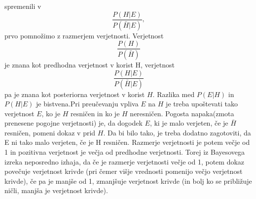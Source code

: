 \documentclass[12pt,a4paper]{amsart}
\theoremstyle{definition} %
\theoremstyle{plain} %
\begin{document}
spremenili v 
\[
    \frac{P(H \lvert E)}{P(\bar{H} \lvert E)},
\] 
prvo pomnožimo z razmerjem verjetnosti. Verjetnost 
\[
    \frac{P(H)}{P(\bar{H})}
\]
je znana kot predhodna verjetnost v korist H, verjetnost 
\[
    \frac{P(H \lvert E)}{P(\bar{H} \lvert E)} 
\]
pa je znana kot posteriorna verjetnost v korist $H$. Razlika med $P(E \lvert H)$ in $P(H \lvert E)$ je bistvena.Pri preučevanju vpliva 
$E$ na $H$ je treba upoštevati tako verjetnost $E$, ko je $H$ resničen in ko je $H$ neresničen. Pogosta napaka(zmota prenesene pogojne 
verjetnosti) je, da dogodek $E$, ki je malo verjeten, če je $\bar{H}$ resničen, pomeni dokaz v prid $H$. Da bi bilo tako, je treba dodatno 
zagotoviti, da E ni tako malo verjeten, če je H resničen. Razmerje verjetnosti je potem večje od 1 in pozitivna verjetnost je večja od 
predhodne verjetnosti. Torej iz Bayesovega izreka neposredno izhaja, da če je razmerje verjetnosti večje od 1, potem dokaz povečuje 
verjetnost krivde (pri čemer višje vrednosti pomenijo večjo verjetnost krivde), če pa je manjše od 1, zmanjšuje verjetnost krivde 
(in bolj ko se približuje ničli, manjša je verjetnost krivde).

\end{document}
